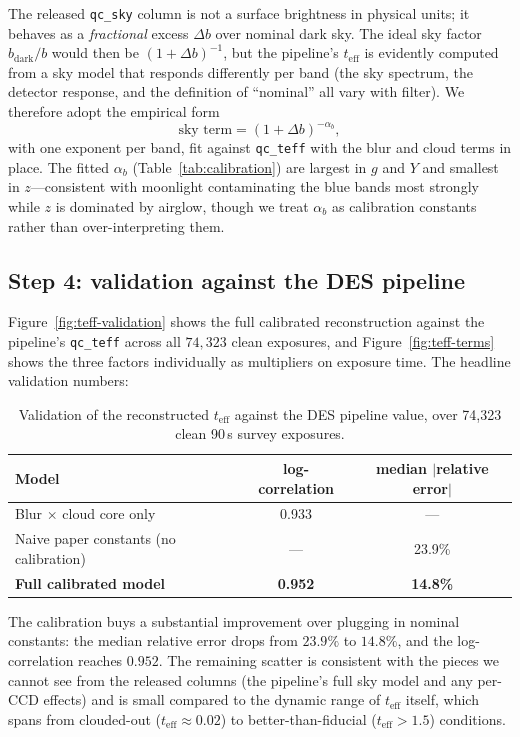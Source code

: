 \documentclass[11pt]{article}
\newcommand{\teff}{t_{\mathrm{eff}}}
\begin{document}
The released \texttt{qc\_sky} column is not a surface brightness in physical units;
it behaves as a \emph{fractional} excess $\Delta b$ over nominal dark sky. The ideal
sky factor $b_{\mathrm{dark}}/b$ would then be $(1+\Delta b)^{-1}$, but the pipeline's
$\teff$ is evidently computed from a sky model that responds differently per band
(the sky spectrum, the detector response, and the definition of ``nominal'' all vary
with filter). We therefore adopt the empirical form
\begin{equation}
  \text{sky term} = (1+\Delta b)^{-\alpha_b},
\end{equation}
with one exponent per band, fit against \texttt{qc\_teff} with the blur and cloud
terms in place. The fitted $\alpha_b$ (Table~\ref{tab:calibration}) are largest in
$g$ and $Y$ and smallest in $z$---consistent with moonlight contaminating the blue
bands most strongly while $z$ is dominated by airglow, though we treat $\alpha_b$ as
calibration constants rather than over-interpreting them.

\subsection{Step 4: validation against the DES pipeline}

Figure~\ref{fig:teff-validation} shows the full calibrated reconstruction against the
pipeline's \texttt{qc\_teff} across all $74{,}323$ clean exposures, and
Figure~\ref{fig:teff-terms} shows the three factors individually as multipliers on
exposure time. The headline validation numbers:

\begin{table}[htbp]
  \centering
  \caption{Validation of the reconstructed $\teff$ against the DES pipeline value,
    over 74{,}323 clean 90\,s survey exposures.}
  \label{tab:validation}
  \begin{tabular}{lcc}
    \toprule
    Model & log-correlation & median $|$relative error$|$ \\
    \midrule
    Blur $\times$ cloud core only         & 0.933 & --- \\
    Naive paper constants (no calibration) & ---   & 23.9\% \\
    \textbf{Full calibrated model}         & \textbf{0.952} & \textbf{14.8\%} \\
    \bottomrule
  \end{tabular}
\end{table}

The calibration buys a substantial improvement over plugging in nominal constants:
the median relative error drops from $23.9\%$ to $14.8\%$, and the log-correlation
reaches $0.952$. The remaining scatter is consistent with the pieces we cannot see
from the released columns (the pipeline's full sky model and any per-CCD effects) and
is small compared to the dynamic range of $\teff$ itself, which spans from clouded-out
($\teff \approx 0.02$) to better-than-fiducial ($\teff > 1.5$) conditions.
\end{document}
